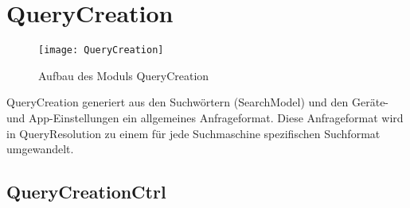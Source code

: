 
\section{QueryCreation}

\begin{figure}[htb]
   \centering
  	\texttt{[image: QueryCreation]}
  	\caption{Aufbau des Moduls QueryCreation}
	\label{fig:Aufbau des Moduls QueryCreation}
\end{figure}

QueryCreation generiert aus den Suchwörtern (SearchModel) und den Geräte- und App-Einstellungen ein allgemeines Anfrageformat. Diese Anfrageformat wird in QueryResolution zu einem für jede Suchmaschine spezifischen Suchformat umgewandelt.

\subsection{QueryCreationCtrl}

